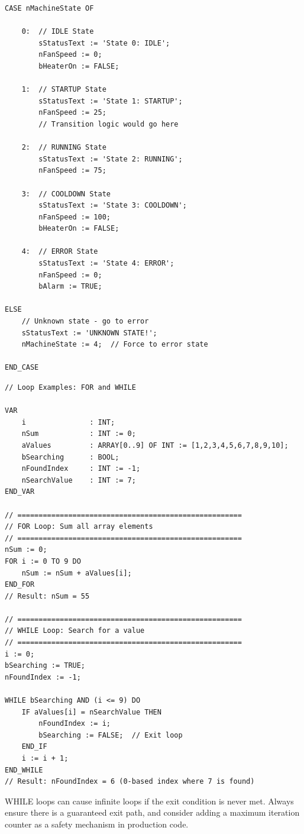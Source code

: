 \documentclass[11pt,a4paper]{article}
\begin{document}
\begin{lstlisting}
CASE nMachineState OF

    0:  // IDLE State
        sStatusText := 'State 0: IDLE';
        nFanSpeed := 0;
        bHeaterOn := FALSE;
        
    1:  // STARTUP State
        sStatusText := 'State 1: STARTUP';
        nFanSpeed := 25;
        // Transition logic would go here
        
    2:  // RUNNING State
        sStatusText := 'State 2: RUNNING';
        nFanSpeed := 75;
        
    3:  // COOLDOWN State
        sStatusText := 'State 3: COOLDOWN';
        nFanSpeed := 100;
        bHeaterOn := FALSE;
        
    4:  // ERROR State
        sStatusText := 'State 4: ERROR';
        nFanSpeed := 0;
        bAlarm := TRUE;
        
ELSE
    // Unknown state - go to error
    sStatusText := 'UNKNOWN STATE!';
    nMachineState := 4;  // Force to error state
    
END_CASE
\end{lstlisting}

\begin{lstlisting}
// Loop Examples: FOR and WHILE

VAR
    i               : INT;
    nSum            : INT := 0;
    aValues         : ARRAY[0..9] OF INT := [1,2,3,4,5,6,7,8,9,10];
    bSearching      : BOOL;
    nFoundIndex     : INT := -1;
    nSearchValue    : INT := 7;
END_VAR

// =====================================================
// FOR Loop: Sum all array elements
// =====================================================
nSum := 0;
FOR i := 0 TO 9 DO
    nSum := nSum + aValues[i];
END_FOR
// Result: nSum = 55

// =====================================================
// WHILE Loop: Search for a value
// =====================================================
i := 0;
bSearching := TRUE;
nFoundIndex := -1;

WHILE bSearching AND (i <= 9) DO
    IF aValues[i] = nSearchValue THEN
        nFoundIndex := i;
        bSearching := FALSE;  // Exit loop
    END_IF
    i := i + 1;
END_WHILE
// Result: nFoundIndex = 6 (0-based index where 7 is found)
\end{lstlisting}

\begin{warningbox}
WHILE loops can cause infinite loops if the exit condition is never met. Always ensure there is a guaranteed exit path, and consider adding a maximum iteration counter as a safety mechanism in production code.
\end{warningbox}
\end{document}
